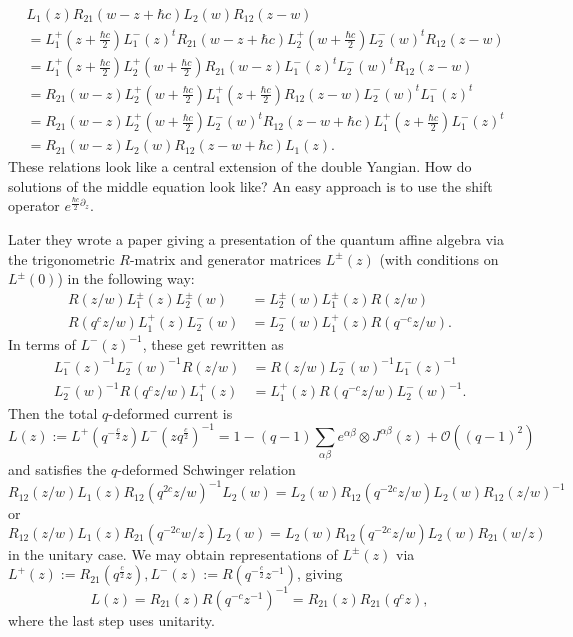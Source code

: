 \documentclass[11pt]{report}
\theoremstyle{definition}
\theoremstyle{remark}
\theoremstyle{remark}
\begin{document}
\begin{align*}
&L_1(z) R_{21}(w-z+\hbar c) L_2(w) R_{12}(z-w) \\
&= L_1^+(z+\tfrac{\hbar c}{2}) L_1^-(z)^t R_{21}(w-z+\hbar c) L_2^+(w+\tfrac{\hbar c}{2}) L_2^-(w)^t R_{12}(z-w) \\
&= L_1^+(z+\tfrac{\hbar c}{2}) L_2^+(w+\tfrac{\hbar c}{2}) R_{21}(w-z) L_1^-(z)^t L_2^-(w)^t R_{12}(z-w) \\
&= R_{21}(w-z) L_2^+(w+\tfrac{\hbar c}{2}) L_1^+(z+\tfrac{\hbar c}{2}) R_{12}(z-w) L_2^-(w)^t L_1^-(z)^t \\
&= R_{21}(w-z) L_2^+(w+\tfrac{\hbar c}{2}) L_2^-(w)^t R_{12}(z-w+\hbar c) L_1^+(z+\tfrac{\hbar c}{2}) L_1^-(z)^t \\
&= R_{21}(w-z) L_2(w) R_{12}(z-w+\hbar c) L_1(z).
\end{align*}
These relations look like a central extension of the double Yangian. How do solutions of the middle equation look like? An easy approach is to use the shift operator $e^{\tfrac{\hbar c}{2} \partial_z}$.

Later they wrote a paper giving a presentation of the quantum affine algebra via the trigonometric $R$-matrix and generator matrices $L^\pm(z)$ (with conditions on $L^\pm(0)$) in the following way:
\begin{align*}
R(z/w) L_1^\pm(z) L_2^\pm(w) &= L_2^\pm(w) L_1^\pm(z) R(z/w) \\
R(q^cz/w) L_1^+(z) L_2^-(w) &= L_2^-(w) L_1^+(z) R(q^{-c}z/w).
\end{align*}
In terms of $L^-(z)^{-1}$, these get rewritten as
\begin{align*}
L_1^-(z)^{-1} L_2^-(w)^{-1} R(z/w) &= R(z/w) L_2^-(w)^{-1} L_1^-(z)^{-1} \\
L_2^-(w)^{-1} R(q^cz/w) L_1^+(z) &= L_1^+(z) R(q^{-c}z/w) L_2^-(w)^{-1}.
\end{align*}
Then the total $q$-deformed current is
\begin{equation*}
L(z) := L^+(q^{-\frac{c}{2}}z) L^-(zq^{\frac{c}{2}})^{-1} = 1 - (q-1) \sum_{\alpha\beta} e^{\alpha\beta} \otimes J^{\alpha\beta}(z) + \mathcal{O}((q-1)^2)
\end{equation*}
and satisfies the $q$-deformed Schwinger relation
\begin{equation*}
R_{12}(z/w) L_1(z) R_{12}(q^{2c}z/w)^{-1} L_2(w) = L_2(w) R_{12}(q^{-2c}z/w) L_2(w) R_{12}(z/w)^{-1}
\end{equation*}
or
\begin{equation*}
R_{12}(z/w) L_1(z) R_{21}(q^{-2c}w/z) L_2(w) = L_2(w) R_{12}(q^{-2c}z/w) L_2(w) R_{21}(w/z)
\end{equation*}
in the unitary case. We may obtain representations of $L^\pm(z)$ via $L^+(z) := R_{21}(q^{\frac{c}{2}}z), L^-(z) := R(q^{-\frac{c}{2}}z^{-1})$, giving
\begin{equation*}
L(z) = R_{21}(z) R(q^{-c}z^{-1})^{-1} = R_{21}(z) R_{21}(q^c z),
\end{equation*}
where the last step uses unitarity.
\end{document}
